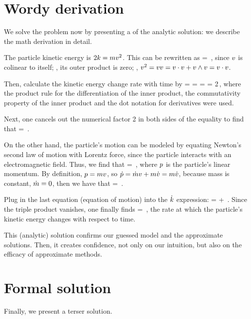 \section{Wordy derivation}
% 
We solve the problem now by presenting a  of the analytic solution: we describe the math derivation in detail.

The particle kinetic energy is $2k = mv^2$. This can be rewritten as
%
\ekin = \mass\vel\iprod\vel\,,
\eeq
%
since $v$ is colinear to itself; \ie, its outer product is zero; \viz, $v^2 = vv = v\cdot v + v\wedge v = v\cdot v$. 

Then, calculate the kinetic energy change rate with time by
%
\ekin = \mass\vel\iprod\vel {}\dt\ekin = \mass\parth{\dt\vel\iprod\vel + \vel\iprod\dt\vel} 
            = \mass\parth{\dt\vel\iprod\vel + \dt\vel\iprod\vel}
            = 2\mass\dt\vel\iprod\vel\,,
\eeq
%
where the product rule for the differentiation of the inner product, the commutativity property of the inner product and the dot notation for derivatives were used.

Next, one cancels out the numerical factor 2 in both sides of the equality to find that
%
\beq
  \ekin = \mass\dt\vel\iprod\vel\,.
\eeq

On the other hand, the particle's motion can be modeled by equating Newton's second law of motion with Lorentz force, since the particle interacts with an electromagnetic field. Thus, we find that
%
\beq
  \dt\mom = \echarge\parth{\efield + \vel\cprod\mfield}\,,
\eeq
%
where $p$ is the particle's linear momentum. By definition, $p = mv$, so $\dot{p} = \dot{m}v + m\dot{v} = m\dot{v}$, because mass is constant, $\dot{m} = 0$, then we have that
%
\beq
  \mass\dt\vel = \echarge\parth{\efield + \vel\cprod\mfield}\,.
\eeq

Plug in the last equation (equation of motion) into the $\dot{k}$ expression:
%
\beq
  \dt\ekin = \echarge\efield\iprod\vel + \echarge\parth{\vel\cprod\mfield}\iprod\vel\,.
\eeq
%
Since the triple product vanishes, one finally finds
%
\beq
  \dt\ekin = \echarge\efield\iprod\vel\,,
\eeq
%
the rate at which the particle's kinetic energy changes with respect to time.

This (analytic) solution confirms our guessed model and the approximate solutions. Then, it creates confidence, not only on our intuition, but also on the efficacy of approximate methods.


\section{Formal solution}
%
Finally, we present a terser solution.


